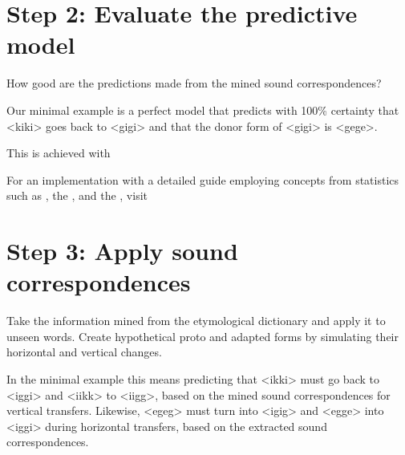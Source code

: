 \documentclass[letterpaper,10pt,english]{sphinxmanual}
\begin{document}
\section{Step 2: Evaluate the predictive model}
\label{\detokenize{tutorial:step-2-evaluate-the-predictive-model}}
\sphinxAtStartPar
How good are the predictions made from the mined sound correspondences?

\sphinxAtStartPar
Our minimal example is a perfect model that predicts with 100\% certainty that
\textless{}kiki\textgreater{} goes back to \textless{}gigi\textgreater{} and that the donor form of \textless{}gigi\textgreater{} is \textless{}gege\textgreater{}.

\sphinxAtStartPar
This is achieved with 

\sphinxAtStartPar
For an implementation with a detailed guide
employing concepts from statistics such as ,
the ,
and the ,
visit 


\section{Step 3: Apply sound correspondences}
\label{\detokenize{tutorial:step-3-apply-sound-correspondences}}
\sphinxAtStartPar
Take the information mined from the etymological dictionary
and apply it to unseen words.
Create hypothetical proto\sphinxhyphen{} and adapted forms by simulating their horizontal
and vertical changes.

\sphinxAtStartPar
In the minimal example this means predicting that \textless{}ikki\textgreater{} must go back to
\textless{}iggi\textgreater{} and \textless{}iikk\textgreater{} to \textless{}iigg\textgreater{}, based on the mined sound correspondences for
vertical transfers. Likewise, \textless{}egeg\textgreater{} must turn into \textless{}igig\textgreater{} and \textless{}egge\textgreater{} into
\textless{}iggi\textgreater{} during horizontal transfers, based on the extracted sound
correspondences.
\end{document}
